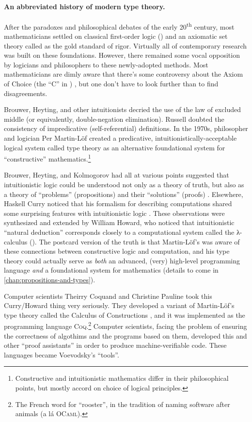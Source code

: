 \documentclass[12pt,twoside]{reedthesis}
\let\oldindex\index
\renewcommand{\index}[1]
               {\oldindex{#1}\marginpar{\footnotesize\color{index}index: #1}}
\newcommand{\indeX}{\oldindex}
\newcommand{\indeX}{\index}
\newcommand{\software}[1]{{\textsc{#1}}\indeX{#1}}
\newcommand{\Coq}{\software{Coq}}
\begin{document}
\paragraph{An abbreviated history of modern type theory.} After the paradoxes
and philosophical debates of the early 20\textsuperscript{th} century, most
mathematicians settled on classical first-order logic (\FOL{}) and an axiomatic
set theory called \ZFC{} as the gold standard of rigor. Virtually all of
contemporary research was built on these foundations. However, there remained
some vocal opposition by logicians and philosophers to these newly-adopted
methods. Most mathematicians are dimly aware that there's some controversy about
the Axiom of Choice (the ``C'' in \ZFC{}) \cite{martin-lof-100-years}, but one
don't have to look further than \FOL{} to find disagreements.

Brouwer, Heyting, and other intuitionists decried the use of the law
of excluded middle (or equivalently, double-negation elimination). Russell
doubted the consistency of impredicative (self-referential) definitions.
In the 1970s, philosopher and logician Per Martin-Löf created a predicative,
intuitionistically-acceptable logical system called type theory as an
alternative foundational system for ``constructive''
mathematics.\footnote{Constructive and intuitionistic mathematics differ in
their philosophical points, but mostly accord on choice of logical principles.}

Brouwer, Heyting, and Kolmogorov had all at various points suggested that
intuitionistic logic could be understood not only as a theory of truth, but also
as a theory of ``problems'' (propositions) and their ``solutions'' (proofs)
\cite{kolmogorov}. Elsewhere, Haskell Curry noticed that his formalism for
describing computations shared some surprising features with intuitionistic
logic \cite{curry-howard}. These observations were synthesized and extended by
William Howard, who noticed that intuitionistic ``natural deduction''
corresponds closely to a computational system called the λ-calculus (\LC{}).
The postcard version of the truth is that Martin-Löf's was aware of these
connections between constructive logic and computation, and his type theory
could actually serve as \textit{both} an advanced, (very) high-level programming
language \textit{and} a foundational system for mathematics (details to come in
\cref{chap:propositions-and-types}).

Computer scientists Theirry Coquand and Christine Pauline took this Curry/Howard
thing very seriously. They developed a variant of Martin-Löf's type theory called
the Calculus of Constructions \cite{coquand}, and it was implemented as the
programming language \Coq{}.\footnote{The French word for ``rooster'', in the
tradition of naming software after animals (a lá \software{OCaml}).} Computer
scientists, facing the problem of ensuring the correctness of algothims and the
programs based on them, developed this and other ``proof assistants'' in order
to produce machine-verifiable code. These languages became Voevodsky's
``tools''.
\end{document}
